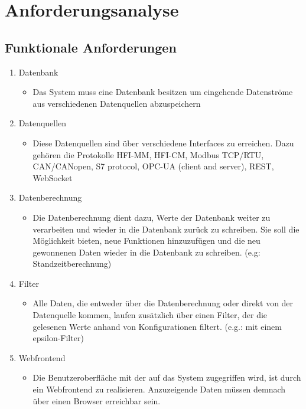 \chapter{Anforderungsanalyse}
\label{ch:Anforderungsanalyse}
\section{Funktionale Anforderungen}

\begin{enumerate}
    \item Datenbank
    \begin{itemize}
        \item Das System muss eine Datenbank besitzen um eingehende Datenströme aus verschiedenen Datenquellen abzuspeichern
    \end{itemize}
    \item Datenquellen
    \begin{itemize}
        \item Diese Datenquellen sind über verschiedene Interfaces zu erreichen. Dazu gehören die Protokolle HFI-MM, HFI-CM, Modbus TCP/RTU, CAN/CANopen, S7 protocol, OPC-UA (client and server), REST, WebSocket
    \end{itemize}
    \item Datenberechnung
    \begin{itemize}
        \item Die Datenberechnung dient dazu, Werte der Datenbank weiter zu verarbeiten und wieder in die Datenbank zurück zu schreiben. Sie soll die Möglichkeit bieten, neue Funktionen hinzuzufügen und die neu gewonnenen Daten wieder in die Datenbank zu schreiben. (e.g: Standzeitberechnung)
    \end{itemize}
    \item Filter
    \begin{itemize}
        \item Alle Daten, die entweder über die Datenberechnung oder direkt von der Datenquelle kommen, laufen zusätzlich über einen Filter, der die gelesenen Werte anhand von Konfigurationen filtert. (e.g.: mit einem epsilon-Filter)
    \end{itemize}
    \item Webfrontend
    \begin{itemize}
        \item Die Benutzeroberfläche mit der auf das System zugegriffen wird, ist durch ein Webfrontend zu realisieren. Anzuzeigende Daten müssen demnach über einen Browser erreichbar sein.

\end{itemize}
\end{enumerate}

